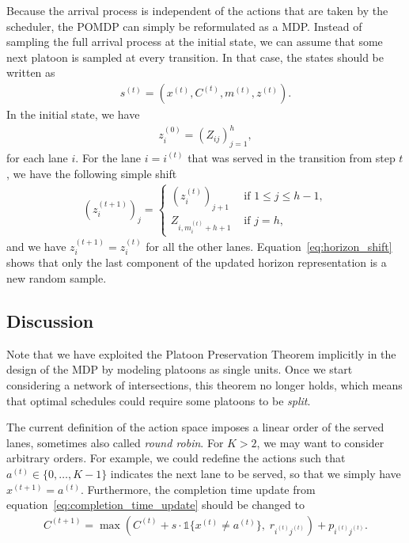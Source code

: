 \documentclass{article}
\theoremstyle{definition}
\theoremstyle{plain}
\begin{document}
Because the arrival process is independent of the actions that are taken by the
scheduler, the POMDP can simply be reformulated as a MDP\@. Instead of sampling
the full arrival process at the initial state, we can assume that some next
platoon is sampled at every transition.
In that case, the states should be written as
\begin{align}
  s^{(t)} = (x^{(t)}, C^{(t)}, m^{(t)}, z^{(t)}) .
\end{align}
%
In the initial state, we have
\begin{align}
  z_{i}^{(0)} = {( Z_{ij} )}_{j=1}^{h} ,
\end{align}
for each lane $i$.
%
For the lane $i=i^{(t)}$ that was served in the transition from step $t$,
we have the following simple shift
\begin{align}
  \label{eq:horizon_shift}
  (z_{i}^{(t+1)})_{j} = \begin{cases}
                          {(z_{i}^{(t)})}_{j+1} & \text{ if } 1 \leq j \leq h - 1 , \\
                          Z_{i,m_{i}^{(t)} + h + 1}              & \text{ if } j = h ,
                       \end{cases}
\end{align}
and we have $z_{i}^{(t+1)} = z_{i}^{(t)}$ for all the other lanes.
Equation~\eqref{eq:horizon_shift} shows that only the last component of the
updated horizon representation is a new random sample.

\subsection{Discussion}

Note that we have exploited the Platoon Preservation Theorem implicitly in the design of
the MDP by modeling platoons as single units. Once we start considering a
network of intersections, this theorem no longer holds, which means that optimal
schedules could require some platoons to be \textit{split}.

The current definition of the action space imposes a linear order of
the served lanes, sometimes also called \textit{round robin}. For $K>2$, we may
want to consider arbitrary orders. For example, we could redefine the actions
such that $a^{(t)} \in \{ 0, \dots, K-1 \}$ indicates the next lane to be
served, so that we simply have $x^{(t+1)} = a^{(t)}$.
Furthermore, the completion time update from equation~\ref{eq:completion_time_update} should be changed to
\begin{align}
  C^{(t+1)} = \max\left( C^{(t)} + s \cdot \mathbb{1} \{ x^{(t)} \neq a^{(t)} \} , \; r_{i^{(t)}j^{(t)}} \right) + p_{i^{(t)}j^{(t)}} .
\end{align}
\end{document}

